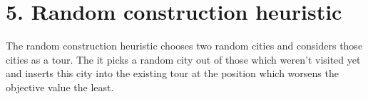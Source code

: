 \section*{5. Random construction heuristic}
The random construction heuristic chooses two random cities and considers those cities as a tour. The it picks a random city out of those which weren't visited yet and inserts this city into the existing tour at the position which worsens the objective value the least.